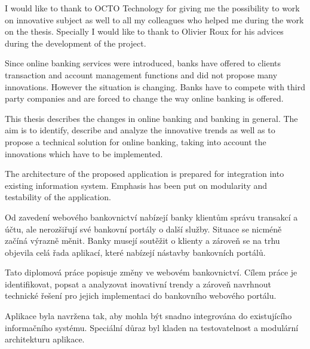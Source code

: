 \documentclass[11pt,twoside,a4paper]{book}
\begin{document}

\coverpagestarts


\acknowledgements
\noindent
I would like to thank to OCTO Technology for giving me the possibility to work on innovative subject as well to all my colleagues who helped me during the work on the thesis. Specially I would like to thank to Olivier Roux for his advices during the development of the project.





\abstractpage
Since online banking services were introduced, banks have offered to clients transaction and account management functions and did not propose many innovations. However the situation is changing. Banks have to compete with third party companies and are forced to change the way online banking is offered.

This thesis describes the changes in online banking and banking in general. The aim is to identify, describe and analyze the innovative trends as well as to propose a technical solution for online banking, taking into account the innovations which have to be implemented.

The architecture of the proposed application is prepared for integration into existing information system. Emphasis has been put on modularity and testability of the application.


\baselineskip

\noindent
Od zavedení webového bankovnictví nabízejí banky klientům správu transakcí a účtu, ale nerozšiřují své bankovní portály o další služby. Situace se nicméně začíná výrazně měnit. Banky musejí soutěžit o klienty a zároveň se na trhu objevila celá řada aplikací, které nabízejí nástavby bankovních portálů.

Tato diplomová práce popisuje změny ve webovém bankovnictví. Cílem práce je identifikovat, popsat a analyzovat inovativní trendy a zároveň navrhnout technické řešení pro jejich implementaci do bankovního webového portálu.

Aplikace byla navržena tak, aby mohla být snadno integrována do existujícího informačního systému. Speciální důraz byl kladen na testovatelnost a modulární architekturu aplikace.
\end{document}
